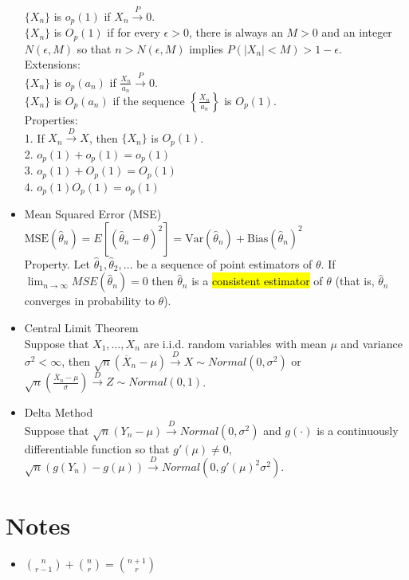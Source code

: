 \documentclass[a4paper,10pt]{article}
\begin{document}
\begin{multicols}{2}
\begin{itemize}
    $\{X_n\}$ is $o_p(1)$ if $X_n \overset{P}{\to} 0$.\\
    $\{X_n\}$ is $O_p(1)$ if for every $\epsilon > 0$, there is always an $M > 0$ and an integer $N(\epsilon, M)$ so that $n > N(\epsilon, M)$ implies  
    $ P(|X_n| < M) > 1 - \epsilon $.\\
    Extensions:  \\
    $\{X_n\}$ is $o_p(a_n)$ if $\frac{X_n}{a_n} \overset{P}{\to} 0$.\\
    $\{X_n\}$ is $O_p(a_n)$ if the sequence $\left\{\frac{X_n}{a_n}\right\}$ is $O_p(1)$.\\
    Properties:\\
    1. If $X_n \overset{D}{\to} X$, then $\{X_n\}$ is $O_p(1)$.\\
    2. $o_p(1) + o_p(1) = o_p(1)$ \\     
    3. $o_p(1) + O_p(1) = O_p(1)$\\      
    4. $o_p(1) O_p(1) = o_p(1)$  
    \item Mean Squared Error (MSE)\\
    $\mathrm{MSE}(\hat{\theta}_n) = E\left[(\hat{\theta}_n - \theta)^2\right]= \mathrm{Var}(\hat{\theta}_n) + \mathrm{Bias}(\hat{\theta}_n)^2$\\
    Property. Let $\hat{\theta}_1, \hat{\theta}_2, \ldots$ be a sequence of point estimators of $\theta$. If $\lim_{n \to \infty} MSE(\hat{\theta}_n) = 0$ then $\hat{\theta}_n$ is a \hl{consistent estimator} of $\theta$ (that is, $\hat{\theta}_n$ converges in probability to $\theta$).
    \item Central Limit Theorem\\
    Suppose that $X_1, \ldots, X_n$ are i.i.d. random variables with mean $\mu$ and variance $\sigma^2 < \infty$, then  
    $\sqrt{n} (\overline{X}_n - \mu) \overset{D}{\to} X \sim Normal(0, \sigma^2)$  
    or      
    $\sqrt{n} \left(\frac{\overline{X}_n - \mu}{\sigma}\right) \overset{D}{\to} Z \sim Normal(0, 1)$.
    \item Delta Method\\
    Suppose that $\sqrt{n}(Y_n - \mu) \overset{D}{\to} Normal(0, \sigma^2)$  
    and $g(\cdot)$ is a continuously differentiable function so that $g'(\mu) \neq 0$, 
    $\sqrt{n}(g(Y_n) - g(\mu)) \overset{D}{\to} Normal(0, g'(\mu)^2 \sigma^2)$.
    
    
    



\end{itemize}
    

\section*{Notes}
\begin{itemize}
    \item $\binom{n}{r-1}+\binom{n}{r}=\binom{n+1}{r}$
\end{itemize}
\end{multicols}
\end{document}
